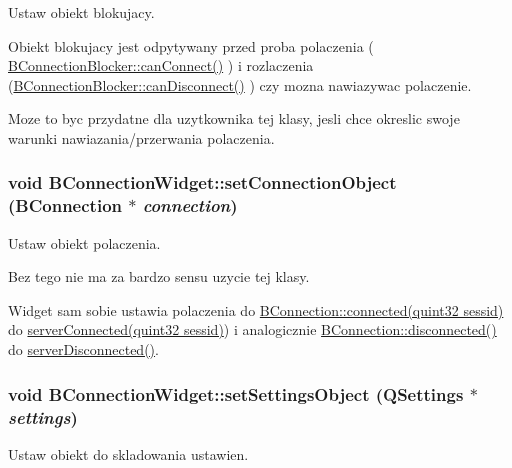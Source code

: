 Ustaw obiekt blokujacy. 

Obiekt blokujacy jest odpytywany przed proba polaczenia ( \hyperlink{class_b_connection_blocker_a2ebcdef0e5570c7331036dd5b6ba4448}{BConnectionBlocker::canConnect()} ) i rozlaczenia (\hyperlink{class_b_connection_blocker_a81e8782c93ac1943a7e19b4ed7ced792}{BConnectionBlocker::canDisconnect()} ) czy mozna nawiazywac polaczenie.

Moze to byc przydatne dla uzytkownika tej klasy, jesli chce okreslic swoje warunki nawiazania/przerwania polaczenia. \hypertarget{class_b_connection_widget_a476033357eea69f9ef4a7f4235a97556}{
\subsubsection[{setConnectionObject}]{\setlength{\rightskip}{0pt plus 5cm}void BConnectionWidget::setConnectionObject ({\bf BConnection} $\ast$ {\em connection})}}
\label{class_b_connection_widget_a476033357eea69f9ef4a7f4235a97556}


Ustaw obiekt polaczenia. 

Bez tego nie ma za bardzo sensu uzycie tej klasy.

Widget sam sobie ustawia polaczenia do \hyperlink{class_b_connection_a90dca3f0343427e31bb4544a8accf56d}{BConnection::connected(quint32 sessid)} do \hyperlink{class_b_connection_widget_a7c9d3a266939c6719fe198f9b3d67636}{serverConnected(quint32 sessid)}) i analogicznie \hyperlink{class_b_connection_a20fa85863f4cb396d3141e01d4928fd4}{BConnection::disconnected()} do \hyperlink{class_b_connection_widget_a159829b06e46c68a354ec999d4b15b61}{serverDisconnected()}. \hypertarget{class_b_connection_widget_a45070066f5da8af537f422d8b37c7d6e}{
\subsubsection[{setSettingsObject}]{\setlength{\rightskip}{0pt plus 5cm}void BConnectionWidget::setSettingsObject (QSettings $\ast$ {\em settings})}}
\label{class_b_connection_widget_a45070066f5da8af537f422d8b37c7d6e}


Ustaw obiekt do skladowania ustawien. 


